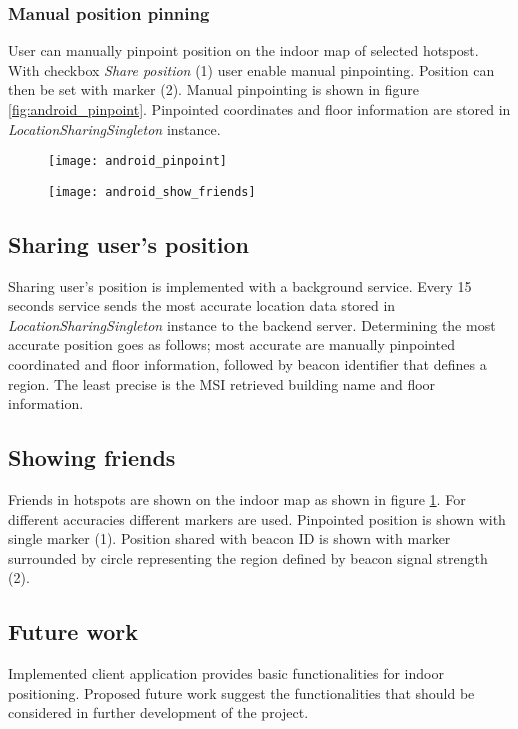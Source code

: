 \subsubsection{Manual position pinning}
User can manually pinpoint position on the indoor map of selected hotspost. With checkbox \textit{Share position} (1) user enable manual pinpointing. Position can then be set with marker (2). Manual pinpointing is shown in figure \ref{fig:android_pinpoint}. Pinpointed coordinates and floor information are stored in \textit{LocationSharingSingleton} instance.

\begin{figure}
\centering
\begin{minipage}{.5\textwidth}
  \centering
  \texttt{[image: android\_pinpoint]}
  \label{fig:android_pinpoint}
\end{minipage}%
\begin{minipage}{.5\textwidth}
  \centering
  \texttt{[image: android\_show\_friends]}
  \label{fig:android_show_friends}
\end{minipage}
\end{figure}

\subsection{Sharing user's position}
Sharing user's position is implemented with a background service. Every 15 seconds service sends the most accurate location data stored in \textit{LocationSharingSingleton} instance to the backend server. Determining the most accurate position goes as follows; most accurate are manually pinpointed coordinated and floor information, followed by beacon identifier that defines a region. The least precise is the MSI retrieved building name and floor information.

\subsection{Showing friends}
Friends in hotspots are shown on the indoor map as shown in figure \ref{fig:android_show_friends}. For different accuracies different markers are used. Pinpointed position is shown with single marker (1). Position shared with beacon ID is shown with marker surrounded by circle representing the region defined by beacon signal strength (2).

\subsection{Future work}
Implemented client application provides basic functionalities for indoor positioning. Proposed future work suggest the functionalities that should be considered in further development of the project.

